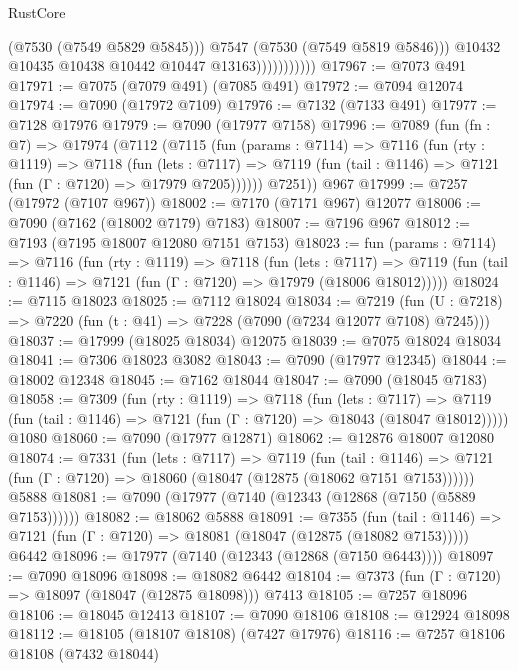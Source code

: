 \begin{lexlean}{RustCore}
\begin{coremodule}
                              (@7530 (@7549 @5829 @5845)))
                            @7547
                            (@7530 (@7549 @5819 @5846)))
                          @10432
                          @10435
                          @10438
                          @10442
                          @10447
                          @13163)))))))))))
@17967 := @7073 @491
@17971 := @7075 (@7079 @491) (@7085 @491)
@17972 := @7094 @12074
@17974 := @7090 (@17972 @7109)
@17976 := @7132 (@7133 @491)
@17977 := @7128 @17976
@17979 := @7090 (@17977 @7158)
@17996 := @7089
    (fun (fn : @7) =>
    @17974
      (@7112
        (@7115
          (fun (params : @7114) =>
          @7116
            (fun (rty : @1119) =>
            @7118
              (fun (lets : @7117) =>
              @7119 (fun (tail : @1146) => @7121 (fun (Γ : @7120) => @17979 @7205))))))
        @7251))
    @967
@17999 := @7257 (@17972 (@7107 @967))
@18002 := @7170 (@7171 @967) @12077
@18006 := @7090 (@7162 (@18002 @7179) @7183)
@18007 := @7196 @967
@18012 := @7193 (@7195 @18007 @12080 @7151 @7153)
@18023 := fun (params : @7114) =>
  @7116
    (fun (rty : @1119) =>
    @7118
      (fun (lets : @7117) =>
      @7119 (fun (tail : @1146) => @7121 (fun (Γ : @7120) => @17979 (@18006 @18012)))))
@18024 := @7115 @18023
@18025 := @7112 @18024
@18034 := @7219
    (fun (U : @7218) => @7220 (fun (t : @41) => @7228 (@7090 (@7234 @12077 @7108) @7245)))
@18037 := @17999 (@18025 @18034) @12075
@18039 := @7075 @18024 @18034
@18041 := @7306 @18023 @3082
@18043 := @7090 (@17977 @12345)
@18044 := @18002 @12348
@18045 := @7162 @18044
@18047 := @7090 (@18045 @7183)
@18058 := @7309
    (fun (rty : @1119) =>
    @7118
      (fun (lets : @7117) =>
      @7119 (fun (tail : @1146) => @7121 (fun (Γ : @7120) => @18043 (@18047 @18012)))))
    @1080
@18060 := @7090 (@17977 @12871)
@18062 := @12876 @18007 @12080
@18074 := @7331
    (fun (lets : @7117) =>
    @7119
      (fun (tail : @1146) =>
      @7121 (fun (Γ : @7120) => @18060 (@18047 (@12875 (@18062 @7151 @7153))))))
    @5888
@18081 := @7090 (@17977 (@7140 (@12343 (@12868 (@7150 (@5889 @7153))))))
@18082 := @18062 @5888
@18091 := @7355
    (fun (tail : @1146) => @7121 (fun (Γ : @7120) => @18081 (@18047 (@12875 (@18082 @7153)))))
    @6442
@18096 := @17977 (@7140 (@12343 (@12868 (@7150 @6443))))
@18097 := @7090 @18096
@18098 := @18082 @6442
@18104 := @7373 (fun (Γ : @7120) => @18097 (@18047 (@12875 @18098))) @7413
@18105 := @7257 @18096
@18106 := @18045 @12413
@18107 := @7090 @18106
@18108 := @12924 @18098
@18112 := @18105 (@18107 @18108) (@7427 @17976)
@18116 := @7257 @18106 @18108 (@7432 @18044)

\end{coremodule}
\end{lexlean}
